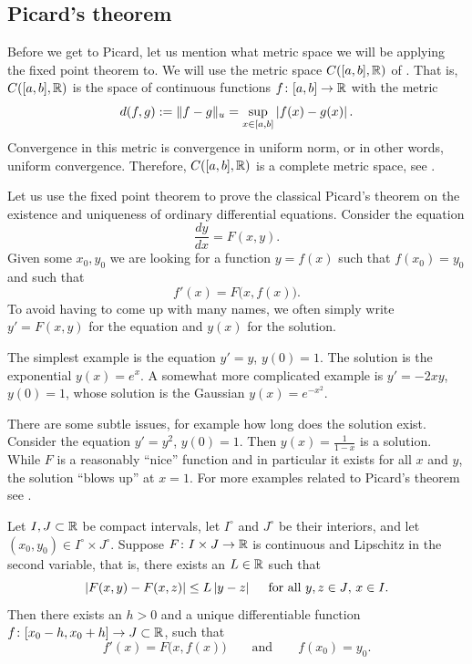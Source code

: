 \subsection{Picard's theorem}

Before we get to Picard, let us mention what metric space we will be
applying the fixed point theorem to.  We will use the metric space
$C([a,b],{\mathbb{R}})$ of .  That is, $C([a,b],{\mathbb{R}})$
is the space of continuous functions $f \colon [a,b] \to {\mathbb{R}}$ with the metric
\begin{equation*}
d(f,g) := \lVert {f-g} \rVert_u = \sup_{x \in [a,b]} \left\lvert {f(x)-g(x)} \right\rvert .
\end{equation*}
Convergence in this metric is convergence in uniform norm, or in other
words, uniform convergence.  Therefore,
$C([a,b],{\mathbb{R}})$ is a complete metric space,
see .

\medskip

Let us use the
fixed point theorem
to prove the classical Picard's theorem on the existence and uniqueness of
ordinary differential equations.
Consider the equation
\begin{equation*}
\frac{dy}{dx} = F(x,y) .
\end{equation*}
Given some $x_0, y_0$ we are looking for a function $y=f(x)$ such that
$f(x_0) = y_0$ and such that
\begin{equation*}
f'(x) = F\bigl(x,f(x)\bigr) .
\end{equation*}
To avoid having to come up with many names, we often simply write $y' = F(x,y)$
for the equation
and $y(x)$ for the solution.

The simplest example is the equation $y' = y$, $y(0) = 1$.
The solution is the exponential $y(x) = e^x$.  A somewhat more complicated
example is $y' = -2xy$, $y(0) = 1$, whose solution is the Gaussian
$y(x) = e^{-x^2}$.

There are some subtle issues, for example how long does the
solution exist.
Consider the equation $y' = y^2$, $y(0)=1$.  Then $y(x) = \frac{1}{1-x}$ is a
solution.  While $F$ is a reasonably ``nice'' function and in particular
it exists for all $x$ and $y$, the solution ``blows up'' at $x=1$.
For more examples related to Picard's theorem see .

\begin{thm}%
Let $I, J \subset {\mathbb{R}}$ be compact intervals, let $I^\circ$ and $J^\circ$
be their interiors, and 
let $(x_0,y_0) \in I^\circ \times J^\circ$.
Suppose $F \colon I \times J \to {\mathbb{R}}$ is continuous
and Lipschitz in the second variable, that is, there exists
an $L \in {\mathbb{R}}$ such that
\begin{equation*}
\left\lvert {F(x,y) - F(x,z)} \right\rvert \leq L \left\lvert {y-z} \right\rvert
\ \ \ \text{ for all $y,z \in J$, $x \in I$} .
\end{equation*}
Then there exists an $h > 0$ and a unique differentiable
function
$f \colon [x_0 - h, x_0 + h] \to J \subset {\mathbb{R}}$, such that
\begin{equation*}
f'(x) = F\bigl(x,f(x)\bigr) \qquad \text{and} \qquad f(x_0) = y_0.
\end{equation*}
\end{thm}

